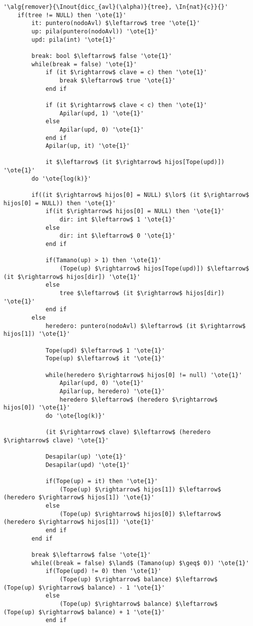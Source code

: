 \begin{lstlisting}[mathescape]
'\alg{remover}{\Inout{dicc_{avl}(\alpha)}{tree}, \In{nat}{c}}{}'
	if(tree != NULL) then '\ote{1}'
		it: puntero(nodoAvl) $\leftarrow$ tree '\ote{1}'
		up: pila(puntero(nodoAvl)) '\ote{1}'
		upd: pila(int) '\ote{1}'

		break: bool $\leftarrow$ false '\ote{1}'
		while(break = false) '\ote{1}'
			if (it $\rightarrow$ clave = c) then '\ote{1}'
				break $\leftarrow$ true '\ote{1}'
			end if

			if (it $\rightarrow$ clave < c) then '\ote{1}'
				Apilar(upd, 1) '\ote{1}'
			else
				Apilar(upd, 0) '\ote{1}'
			end if
			Apilar(up, it) '\ote{1}'

			it $\leftarrow$ (it $\rightarrow$ hijos[Tope(upd)]) '\ote{1}'
		do '\ote{log(k)}'

		if((it $\rightarrow$ hijos[0] = NULL) $\lor$ (it $\rightarrow$ hijos[0] = NULL)) then '\ote{1}'
			if(it $\rightarrow$ hijos[0] = NULL) then '\ote{1}'
				dir: int $\leftarrow$ 1 '\ote{1}'
			else
				dir: int $\leftarrow$ 0 '\ote{1}'
			end if

			if(Tamano(up) > 1) then '\ote{1}'
				(Tope(up) $\rightarrow$ hijos[Tope(upd)]) $\leftarrow$ (it $\rightarrow$ hijos[dir]) '\ote{1}'
			else
				tree $\leftarrow$ (it $\rightarrow$ hijos[dir]) '\ote{1}'
			end if
		else
			heredero: puntero(nodoAvl) $\leftarrow$ (it $\rightarrow$ hijos[1]) '\ote{1}'

			Tope(upd) $\leftarrow$ 1 '\ote{1}'
			Tope(up) $\leftarrow$ it '\ote{1}'

			while(heredero $\rightarrow$ hijos[0] != null) '\ote{1}'
				Apilar(upd, 0) '\ote{1}'
				Apilar(up, heredero) '\ote{1}'
				heredero $\leftarrow$ (heredero $\rightarrow$ hijos[0]) '\ote{1}'
			do '\ote{log(k)}'

			(it $\rightarrow$ clave) $\leftarrow$ (heredero $\rightarrow$ clave) '\ote{1}'

			Desapilar(up) '\ote{1}'
			Desapilar(upd) '\ote{1}'

			if(Tope(up) = it) then '\ote{1}'
				(Tope(up) $\rightarrow$ hijos[1]) $\leftarrow$ (heredero $\rightarrow$ hijos[1]) '\ote{1}'
			else
				(Tope(up) $\rightarrow$ hijos[0]) $\leftarrow$ (heredero $\rightarrow$ hijos[1]) '\ote{1}'
			end if
		end if

		break $\leftarrow$ false '\ote{1}'
		while((break = false) $\land$ (Tamano(up) $\geq$ 0)) '\ote{1}'
			if(Tope(upd) != 0) then '\ote{1}'
				(Tope(up) $\rightarrow$ balance) $\leftarrow$ (Tope(up) $\rightarrow$ balance) - 1 '\ote{1}'
			else
				(Tope(up) $\rightarrow$ balance) $\leftarrow$ (Tope(up) $\rightarrow$ balance) + 1 '\ote{1}'
			end if


\end{lstlisting}
